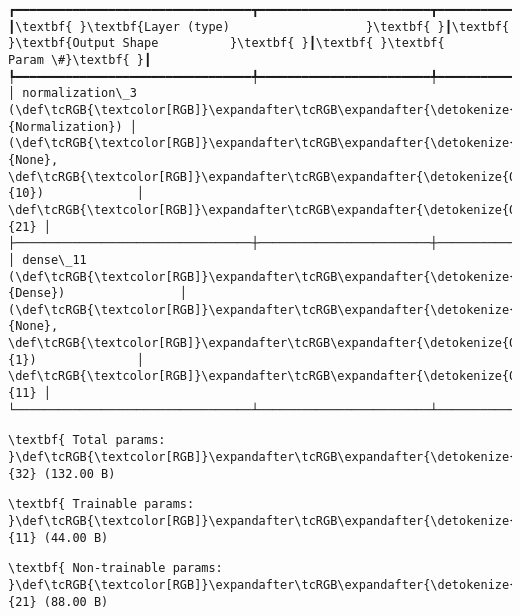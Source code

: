 \documentclass[11pt]{article}
\begin{document}
    \begin{Verbatim}[commandchars=\\\{\}]
┏━━━━━━━━━━━━━━━━━━━━━━━━━━━━━━━━━┳━━━━━━━━━━━━━━━━━━━━━━━━┳━━━━━━━━━━━━━━━┓
┃\textbf{ }\textbf{Layer (type)                   }\textbf{ }┃\textbf{ }\textbf{Output Shape          }\textbf{ }┃\textbf{ }\textbf{      Param \#}\textbf{ }┃
┡━━━━━━━━━━━━━━━━━━━━━━━━━━━━━━━━━╇━━━━━━━━━━━━━━━━━━━━━━━━╇━━━━━━━━━━━━━━━┩
│ normalization\_3 (\def\tcRGB{\textcolor[RGB]}\expandafter\tcRGB\expandafter{\detokenize{0,135,255}}{Normalization}) │ (\def\tcRGB{\textcolor[RGB]}\expandafter\tcRGB\expandafter{\detokenize{0,215,255}}{None}, \def\tcRGB{\textcolor[RGB]}\expandafter\tcRGB\expandafter{\detokenize{0,175,0}}{10})             │            \def\tcRGB{\textcolor[RGB]}\expandafter\tcRGB\expandafter{\detokenize{0,175,0}}{21} │
├─────────────────────────────────┼────────────────────────┼───────────────┤
│ dense\_11 (\def\tcRGB{\textcolor[RGB]}\expandafter\tcRGB\expandafter{\detokenize{0,135,255}}{Dense})                │ (\def\tcRGB{\textcolor[RGB]}\expandafter\tcRGB\expandafter{\detokenize{0,215,255}}{None}, \def\tcRGB{\textcolor[RGB]}\expandafter\tcRGB\expandafter{\detokenize{0,175,0}}{1})              │            \def\tcRGB{\textcolor[RGB]}\expandafter\tcRGB\expandafter{\detokenize{0,175,0}}{11} │
└─────────────────────────────────┴────────────────────────┴───────────────┘

    \end{Verbatim}

    
    
    \begin{Verbatim}[commandchars=\\\{\}]
\textbf{ Total params: }\def\tcRGB{\textcolor[RGB]}\expandafter\tcRGB\expandafter{\detokenize{0,175,0}}{32} (132.00 B)

    \end{Verbatim}

    
    
    \begin{Verbatim}[commandchars=\\\{\}]
\textbf{ Trainable params: }\def\tcRGB{\textcolor[RGB]}\expandafter\tcRGB\expandafter{\detokenize{0,175,0}}{11} (44.00 B)

    \end{Verbatim}

    
    
    \begin{Verbatim}[commandchars=\\\{\}]
\textbf{ Non-trainable params: }\def\tcRGB{\textcolor[RGB]}\expandafter\tcRGB\expandafter{\detokenize{0,175,0}}{21} (88.00 B)

    \end{Verbatim}
\end{document}
